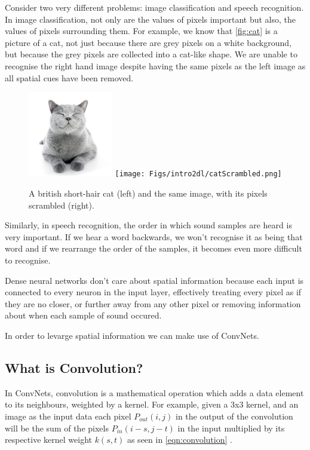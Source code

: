 Consider two very different problems: image classification and speech recognition. In image classification, not only are the values of pixels important but also, the values of pixels surrounding them. For example, we know that \autoref{fig:cat} is a picture of a cat, not just because there are grey pixels on a white background, but because the grey pixels are collected into a cat-like shape. We are unable to recognise the right hand image despite having the same pixels as the left image as all spatial cues have been removed.

\begin{figure}[h]
	\centering
	\includegraphics[width=0.33\textwidth]{Figs/intro2dl/cat.png}
	\texttt{[image: Figs/intro2dl/catScrambled.png]}
	
	\caption{A british short-hair cat (left) and the same image, with its pixels scrambled (right).}
	\label{fig:cat}
\end{figure}

Similarly, in speech recognition, the order in which sound samples are heard is very important. If we hear a word backwards, we won't recognise it as being that word and if we rearrange the order of the samples, it becomes even more difficult to recognise.

Dense neural networks don't care about spatial information because each input is connected to every neuron in the input layer, effectively treating every pixel as if they are no closer, or further away from any other pixel or removing information about when each sample of sound occured.

In order to levarge spatial information we can make use of \acp{ConvNet}.

\subsection{What is Convolution?}
In \acp{ConvNet}, convolution is a mathematical operation which adds a data element to its neighbours, weighted by a kernel. For example, given a 3x3 kernel, and an image as the input data each pixel $P_{out}(i,j)$ in the output of the convolution will be the sum of the pixels $P_{in}(i-s, j-t)$ in the input  multiplied by its respective kernel weight $k(s,t)$ as seen in \autoref{eqn:convolution} \cite{dumoulin2016guide}.

